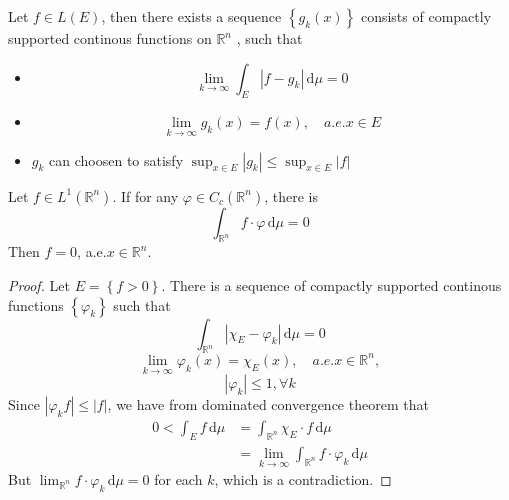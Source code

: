 \documentclass[../main.tex]{subfiles}
\begin{document}
\begin{corollary}{}{}
    Let \(  f \in L\left( E \right)   \), then there exists a sequence \(  \left\{ g_{k}\left( x \right)  \right\}  \)  consists of compactly supported continous functions on \(  \mathbb{R} ^{n}  \)   , such that   \begin{itemize}
        \item \[
        \lim_{k\to \infty}\int_{E}\left| f-g_{k} \right|\,\mathrm{d} \mu = 0 
        \]
        \item \[
        \lim_{k\to \infty}g_{k}\left( x \right)= f\left( x \right),\quad a.e. x\in E  
        \]
    \end{itemize}
\end{corollary}
\begin{remark}
    \begin{itemize}
        \item \(  g_{k}  \) can choosen to satisfy \(  \sup _{x\in E}\left| g_{k} \right|\le \sup _{x\in E}\left| f \right|    \)  
    \end{itemize}
    
\end{remark}
\begin{proposition}{}{}
    Let \(  f \in L^{1}\left( \mathbb{R}^{n} \right)   \). If for any \(   \varphi \in C_{c}\left( \mathbb{R} ^{n} \right)   \), there is \[
    \int_{\mathbb{R}^{n}}f\cdot  \varphi \,\mathrm{d} \mu = 0
    \]  Then \(  f= 0  \), a.e.\(   x\in \mathbb{R}^{n}  \).  
\end{proposition}

\begin{proof}
    Let \(  E= \left\{ f> 0 \right\}  \). There is a sequence of compactly supported continous functions \(  \left\{  \varphi _{k} \right\}  \) such that \[
    \int_{\mathbb{R}^{n}}\left| \chi _{E}- \varphi _{k} \right|\,\mathrm{d} \mu = 0 
    \] \[
    \lim_{k\to \infty} \varphi _{k}\left( x \right)= \chi _{E}\left( x \right),\quad a.e. x\in \mathbb{R}^{n}  , 
    \] \[
  \left|  \varphi _{k} \right|\le 1,\forall k
    \]Since \(  \left|  \varphi _{k}f \right|\le \left| f \right|    \), we have from dominated convergence theorem that    \begin{equation}
    \begin{aligned}
        0< \int_{E}f\,\mathrm{d} \mu &= \int_{\mathbb{R}^{n}} \chi _{E}\cdot f\,\mathrm{d} \mu \\ 
         &= \lim_{k\to \infty} \int_{\mathbb{R}^{n}} f\cdot  \varphi _{k}\,\mathrm{d} \mu 
    \end{aligned}
 \end{equation}
 But \(  \lim_{\mathbb{R}^{n}}f\cdot  \varphi _{k}\,\mathrm{d} \mu = 0  \) for each \(  k  \), which is a contradiction.  
\end{proof}
\end{document}
